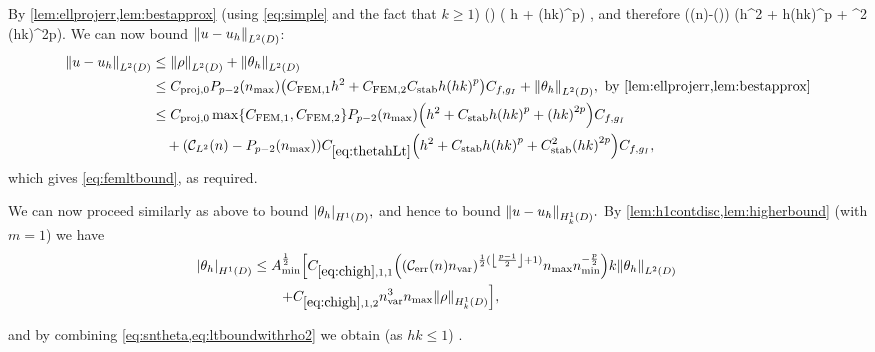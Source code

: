By \cref{lem:ellprojerr,lem:bestapprox} (using \cref{eq:simple} and the fact that $k \geq 1$)
\beq\label{eq:rhoendbound}
\NHokD{\rho} \leq \Crhoendbound  {}\mleft(\nmax\mright) \mleft( h +  \CAnk \mleft(hk\mright)^p\mright) \Cfg,
\eeq
and therefore
\beq\label{eq:thetahLt}
\NLtD{\thetah} \leq \mleft(\CLtn(n)-\mleft(\nmax\mright)\mright) \CthetahLt \mleft(h^2 + \CAnk h\mleft(hk\mright)^p + \CAnk^2 \mleft(hk\mright)^{2p}\mright)\Cfg.
\eeq
We can now bound $\NLtD{u-\uh}$:
\begin{align*}
  \NLtD{u-\uh} &\leq  \NLtD{\rho} + \NLtD{\thetah}\\
  &\leq \Cmmofn{0} \Pfn{p-2}\mleft(\nmax\mright)\mleft(\CFEMo h^2 + \CFEMt \CAnk h\mleft(hk\mright)^{p}\mright)\Cfg + \NLtD{\thetah}, \text{ by \cref{lem:ellprojerr,lem:bestapprox}}\\
  &\leq \Cmmofn{0} \max\set{\CFEMo,\CFEMt}\Pfn{p-2}\mleft(\nmax\mright)\mleft(h^2 +  \CAnk h\mleft(hk\mright)^{p}+ \mleft(hk\mright)^{2p}\mright)\Cfg\\
  &\quad+ \mleft(\CLtn(n)-\Pfn{p-2}\mleft(\nmax\mright)\mright) \CthetahLt \mleft(h^2 + \CAnk h\mleft(hk\mright)^p + \CAnk^2 \mleft(hk\mright)^{2p}\mright)\Cfg,
\end{align*}
which gives \cref{eq:femltbound}, as required.

We can now proceed similarly as above to bound $\SNHoD{\thetah},$ and hence to bound $\NHokD{u-\uh}.$ By \cref{lem:h1contdisc,lem:higherbound} (with $m=1$) we have
\begin{align}
\SNHoD{\thetah} &\leq \Amin^{\half} \mleft[\Chighfn{1,1} \mleft(\mleft(\En\nvar\mright)^{\half(\floor{\frac{p-1}2}+1)}\nmax\nmin^{-\frac{p}2}\mright)k \NLtD{\thetah}\mright.\nonumber\\
&\mleft.\quad\quad+ \Chighfn{1,2} \nvar^3\nmax \NHokD{\rho}\mright],\label{eq:sntheta}
\end{align}

and by combining \cref{eq:sntheta,eq:ltboundwithrho2} we obtain (as $hk \leq 1$)%
\beq\label{eq:hoboundwithrho}
\SNHoD{\thetah} \leq \CHobound {}\NHokD{\rho}.
\eeq

